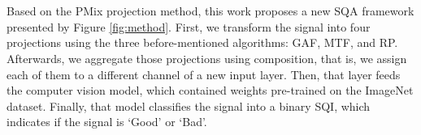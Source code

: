 

\section{}

Based on the \gls{PMix} projection method, this work proposes a new \gls{SQA} framework presented by Figure \ref{fig:method}. First, we transform the signal into four projections using the three before-mentioned algorithms: \gls{GAF}, \gls{MTF}, and \gls{RP}. Afterwards, we aggregate those projections using composition, that is, we assign each of them to a different channel of a new input layer. Then, that layer feeds the computer vision model, which contained weights pre-trained on the ImageNet dataset. 
Finally, that model classifies the signal into a binary \gls{SQI}, which indicates if the signal is `Good' or `Bad'. 



